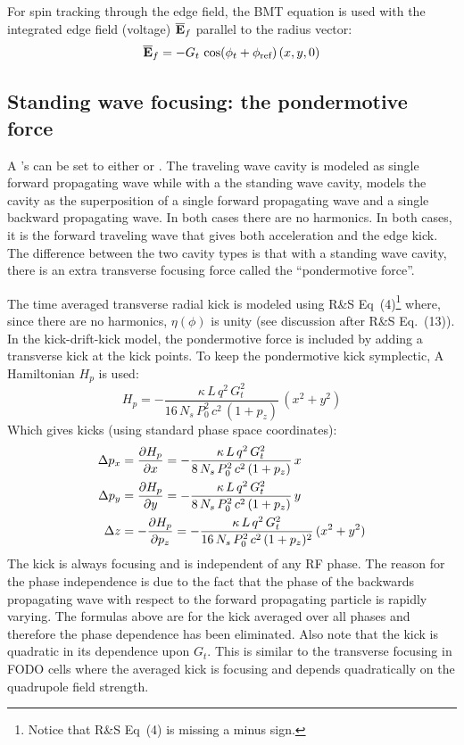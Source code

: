 For spin tracking through the edge field, the BMT equation is used with the integrated edge field
(voltage) $\overline{{\bf E}}_f$ parallel to the radius vector:
\begin{equation}
  \overline{{\bf E}}_f = -G_t \, \cos(\phi_t + \phi_{\text{ref}}) \, (x, y, 0)
\end{equation}

\subsection{Standing wave focusing: the pondermotive force}

A 's  can be set to either  or
. The traveling wave cavity is modeled as single forward propagating wave while
with a the standing wave cavity, \bmad models the cavity as the superposition of a single forward
propagating wave and a single backward propagating wave. In both cases there are no harmonics.  In
both cases, it is the forward traveling wave that gives both acceleration and the edge kick.  The
difference between the two cavity types is that with a standing wave cavity, there is an extra
transverse focusing force called the ``pondermotive force''.

The time averaged transverse radial kick is modeled using R\&S Eq~(4)\footnote
  {
Notice that R\&S Eq~(4) is missing a minus sign.
  }
where, since there are no harmonics, $\eta(\phi)$ is unity (see discussion after R\&S Eq.~(13)).  In
the \bmad kick-drift-kick model, the pondermotive force is included by adding a transverse kick at
the kick points. To keep the pondermotive kick symplectic, A Hamiltonian $H_p$ is used:
\begin{equation}
  H_p = -\frac{\kappa \, L \, q^2 \, G_t^2}{16 \, N_s \, P_0^2 \, c^2 \, (1 + p_z)} \, (x^2 + y^2)
\end{equation}
Which gives kicks (using standard \bmad phase space coordinates):
\begin{align}
  \Delta p_x &= \frac{\partial H_p}{\partial x} 
              = -\frac{\kappa \, L \, q^2 \, G_t^2}{8 \, N_s \, P_0^2 \, c^2 \, (1 + p_z)} \, x \nonumber \\
  \Delta p_y &= \frac{\partial H_p}{\partial y} 
              = -\frac{\kappa \, L \, q^2 \, G_t^2}{8 \, N_s \, P_0^2 \, c^2 \, (1 + p_z)} \, y \\
  \Delta z &= -\frac{\partial H_p}{\partial p_z} 
              = -\frac{\kappa \, L \, q^2 \, G_t^2}{16 \, N_s \, P_0^2 \, c^2 \, (1 + p_z)^2} \, (x^2 + y^2) \nonumber
\end{align}
The kick is always focusing and is independent of any RF phase. The reason for the phase
independence is due to the fact that the phase of the backwards propagating wave with respect to the
forward propagating particle is rapidly varying. The formulas above are for the kick averaged over
all phases and therefore the phase dependence has been eliminated. Also note that the kick is
quadratic in its dependence upon $G_t$. This is similar to the transverse focusing in FODO cells
where the averaged kick is focusing and depends quadratically on the quadrupole field strength.

